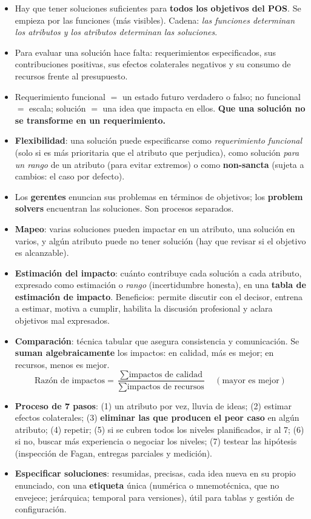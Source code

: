 \documentclass[11pt,a4paper]{article}
\begin{document}
\begin{itemize}
  \item Hay que tener soluciones suficientes para \textbf{todos los objetivos del POS}. Se empieza por las
  funciones (más visibles). Cadena: \emph{las funciones determinan los atributos y los atributos determinan las
  soluciones}.
  \item Para evaluar una solución hace falta: requerimientos especificados, sus contribuciones positivas, sus
  efectos colaterales negativos y su consumo de recursos frente al presupuesto.
  \item Requerimiento funcional $=$ un estado futuro verdadero o falso; no funcional $=$ escala; solución $=$ una
  idea que impacta en ellos. \textbf{Que una solución no se transforme en un requerimiento.}
  \item \textbf{Flexibilidad}: una solución puede especificarse como \emph{requerimiento funcional} (solo si es
  más prioritaria que el atributo que perjudica), como solución \emph{para un rango} de un atributo (para evitar
  extremos) o como \textbf{non-sancta} (sujeta a cambios: el caso por defecto).
  \item Los \textbf{gerentes} enuncian sus problemas en términos de objetivos; los \textbf{problem solvers}
  encuentran las soluciones. Son procesos separados.
  \item \textbf{Mapeo}: varias soluciones pueden impactar en un atributo, una solución en varios, y algún
  atributo puede no tener solución (hay que revisar si el objetivo es alcanzable).
  \item \textbf{Estimación del impacto}: cuánto contribuye cada solución a cada atributo, expresado como
  estimación o \emph{rango} (incertidumbre honesta), en una \textbf{tabla de estimación de impacto}. Beneficios:
  permite discutir con el decisor, entrena a estimar, motiva a cumplir, habilita la discusión profesional y
  aclara objetivos mal expresados.
  \item \textbf{Comparación}: técnica tabular que asegura consistencia y comunicación. Se \textbf{suman
  algebraicamente} los impactos: en calidad, más es mejor; en recursos, menos es mejor.
  \[ \text{Razón de impactos} = \frac{\sum \text{impactos de calidad}}{\sum \text{impactos de recursos}} \quad (\text{mayor es mejor}) \]
  \item \textbf{Proceso de 7 pasos}: (1) un atributo por vez, lluvia de ideas; (2) estimar efectos colaterales;
  (3) \textbf{eliminar las que producen el peor caso} en algún atributo; (4) repetir; (5) si se cubren todos los
  niveles planificados, ir al 7; (6) si no, buscar más experiencia o negociar los niveles; (7) testear las
  hipótesis (inspección de Fagan, entregas parciales y medición).
  \item \textbf{Especificar soluciones}: resumidas, precisas, cada idea nueva en su propio enunciado, con una
  \textbf{etiqueta} única (numérica o mnemotécnica, que no envejece; jerárquica; temporal para versiones), útil
  para tablas y gestión de configuración.
\end{itemize}
\end{document}
